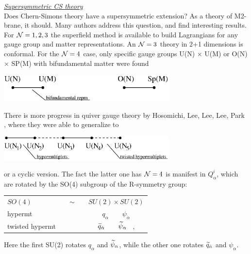 \documentclass[12pt]{article}
\def\calN{{\cal N}}
\begin{document}
\noindent\underline{\large \it Supersymmetric CS theory}\\
Does Chern-Simons theory have a supersymmetric extension? 
As a theory of M2-brane, it should. 
Many authors address this question, and find interesting results. 
For $ \mathcal{N}=1,2,3 $ the superfield method is available to build Lagrangians for any gauge group and matter representations.
An $ \mathcal{N}=3 $ theory in 2+1 dimensions is conformal.
For the $\calN =4 $ case, only specific gauge groups U(N) $\times$ U(M) or O(N) $\times$ SP(M) with bifundamental matter were found \cite{GW}
\begin{center}
\includegraphics[width=9.0cm]{bifund.eps}
\end{center}
There is more progress in quiver gauge theory by Hosomichi, Lee, Lee, Lee, Park \cite{HL3P}, where they were able to generalize to
\begin{center}
\includegraphics[width=9.0cm]{hosomichi.eps}
\end{center}
or a cyclic version.
The fact the latter one has $ \mathcal{N}=4 $ is manifest in $ Q_\alpha^i $, which are rotated by the SO(4) subgroup of the R-symmetry group:
\begin{center}
\begin{tabular}{lcc}
	$SO(4)$ & ~~$\sim$~~ & $SU(2) \times SU(2)$ \\
        hypermt & & $ q_\alpha \qquad \psi_{\dot{\alpha}}$ \\
	twisted hypermt && $ \widetilde{q}_{\dot{\alpha}} \qquad \widetilde{\psi}_\alpha  $ ~,
\end{tabular}
\end{center}
Here the first SU(2) rotates $ q_\alpha $ and $ \widetilde{\psi}_\alpha $, while the other one rotates
$ \widetilde{q}_{\dot{\alpha}} $ and $ \psi_{\dot{\alpha}} $.
\end{document}
